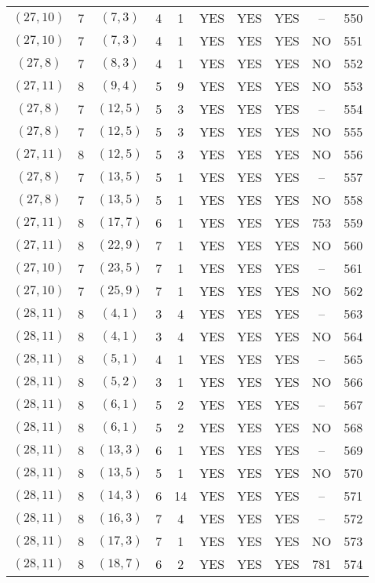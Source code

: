 \begin{longtable}{|c|c|c|c|c|c|c|c|c|c|}
$(27, 10)$ & 7 & $(7, 3)$ & 4 & 1 & YES & YES & YES & -- & 550\\
$(27, 10)$ & 7 & $(7, 3)$ & 4 & 1 & YES & YES & YES & NO & 551\\
$(27, 8)$ & 7 & $(8, 3)$ & 4 & 1 & YES & YES & YES & NO & 552\\
$(27, 11)$ & 8 & $(9, 4)$ & 5 & 9 & YES & YES & YES & NO & 553\\
$(27, 8)$ & 7 & $(12, 5)$ & 5 & 3 & YES & YES & YES & -- & 554\\
$(27, 8)$ & 7 & $(12, 5)$ & 5 & 3 & YES & YES & YES & NO & 555\\
$(27, 11)$ & 8 & $(12, 5)$ & 5 & 3 & YES & YES & YES & NO & 556\\
$(27, 8)$ & 7 & $(13, 5)$ & 5 & 1 & YES & YES & YES & -- & 557\\
$(27, 8)$ & 7 & $(13, 5)$ & 5 & 1 & YES & YES & YES & NO & 558\\
$(27, 11)$ & 8 & $(17, 7)$ & 6 & 1 & YES & YES & YES & 753 & 559\\
$(27, 11)$ & 8 & $(22, 9)$ & 7 & 1 & YES & YES & YES & NO & 560\\
$(27, 10)$ & 7 & $(23, 5)$ & 7 & 1 & YES & YES & YES & -- & 561\\
$(27, 10)$ & 7 & $(25, 9)$ & 7 & 1 & YES & YES & YES & NO & 562\\
$(28, 11)$ & 8 & $(4, 1)$ & 3 & 4 & YES & YES & YES & -- & 563\\
$(28, 11)$ & 8 & $(4, 1)$ & 3 & 4 & YES & YES & YES & NO & 564\\
$(28, 11)$ & 8 & $(5, 1)$ & 4 & 1 & YES & YES & YES & -- & 565\\
$(28, 11)$ & 8 & $(5, 2)$ & 3 & 1 & YES & YES & YES & NO & 566\\
$(28, 11)$ & 8 & $(6, 1)$ & 5 & 2 & YES & YES & YES & -- & 567\\
$(28, 11)$ & 8 & $(6, 1)$ & 5 & 2 & YES & YES & YES & NO & 568\\
$(28, 11)$ & 8 & $(13, 3)$ & 6 & 1 & YES & YES & YES & -- & 569\\
$(28, 11)$ & 8 & $(13, 5)$ & 5 & 1 & YES & YES & YES & NO & 570\\
$(28, 11)$ & 8 & $(14, 3)$ & 6 & 14 & YES & YES & YES & -- & 571\\
$(28, 11)$ & 8 & $(16, 3)$ & 7 & 4 & YES & YES & YES & -- & 572\\
$(28, 11)$ & 8 & $(17, 3)$ & 7 & 1 & YES & YES & YES & NO & 573\\
$(28, 11)$ & 8 & $(18, 7)$ & 6 & 2 & YES & YES & YES & 781 & 574\\

\end{longtable}
